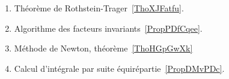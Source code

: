 
	\label{THEMEooMethodesCalcul}
\begin{enumerate}
	\item
	      Théorème de Rothstein-Trager~\ref{ThoXJFatfu}.
	\item
	      Algorithme des facteurs invariants~\ref{PropPDfCqee}.
	\item
	      Méthode de Newton, théorème~\ref{ThoHGpGwXk}
	\item
	      Calcul d'intégrale par suite équirépartie~\ref{PropDMvPDc}.
\end{enumerate}

